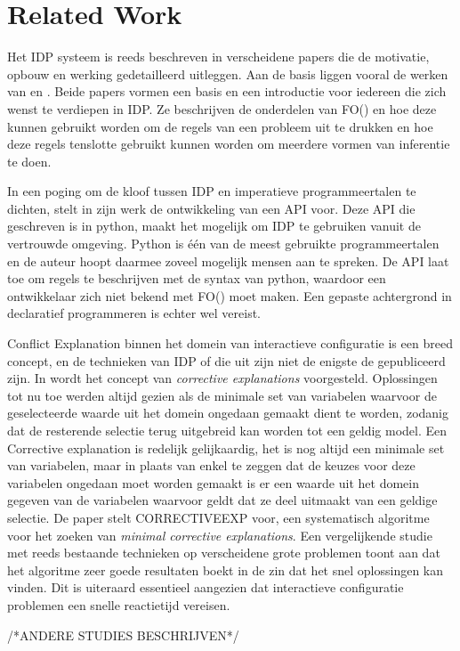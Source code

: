 \chapter{Related Work}
\label{cha:relatedwork}

Het IDP systeem is reeds beschreven in verscheidene papers die de motivatie, opbouw en werking gedetailleerd uitleggen. Aan de basis liggen vooral de werken van \citep{de2014predicate} en \citep{de2014separating}. Beide papers vormen een basis en een introductie voor iedereen die zich wenst te verdiepen in IDP. Ze beschrijven de onderdelen van FO(\textperiodcentered) en hoe deze kunnen gebruikt worden om de regels van een probleem uit te drukken en hoe deze regels tenslotte gebruikt kunnen worden om meerdere vormen van inferentie te doen. 
\par
In een poging om de kloof tussen IDP en imperatieve programmeertalen te dichten, stelt \citep{vennekens2015lowering} in zijn werk de ontwikkeling van een API voor. Deze API die geschreven is in python, maakt het mogelijk om IDP te gebruiken vanuit de vertrouwde omgeving. Python is \'{e}\'{e}n van de meest gebruikte programmeertalen en de auteur hoopt daarmee zoveel mogelijk mensen aan te spreken. De API laat toe om regels te beschrijven met de syntax van python, waardoor een ontwikkelaar zich niet bekend met FO(\textperiodcentered) moet maken. Een gepaste achtergrond in declaratief programmeren is echter wel vereist.
\par
Conflict Explanation binnen het domein van interactieve configuratie is een breed concept, en de technieken van IDP of die uit \citep{amilhastre2002consistency} zijn niet de enigste de gepubliceerd zijn. In \citep{o2005generating} wordt het concept van \textit{corrective explanations} voorgesteld. Oplossingen tot nu toe werden altijd gezien als de minimale set van variabelen waarvoor de geselecteerde waarde uit het domein ongedaan gemaakt dient te worden, zodanig dat de resterende selectie terug uitgebreid kan worden tot een geldig model. Een Corrective explanation is redelijk gelijkaardig, het is nog altijd een minimale set van variabelen, maar in plaats van enkel te zeggen dat de keuzes voor deze variabelen ongedaan moet worden gemaakt is er een waarde uit het domein gegeven van de variabelen waarvoor geldt dat ze deel uitmaakt van een geldige selectie. De paper stelt CORRECTIVEEXP voor, een systematisch algoritme voor het zoeken van \textit{minimal corrective explanations}. Een vergelijkende studie met reeds bestaande technieken op verscheidene grote problemen toont aan dat het algoritme zeer goede resultaten boekt in de zin dat het snel oplossingen kan vinden. Dit is uiteraard essentieel aangezien dat interactieve configuratie problemen een snelle reactietijd vereisen.

/*ANDERE STUDIES BESCHRIJVEN*/
